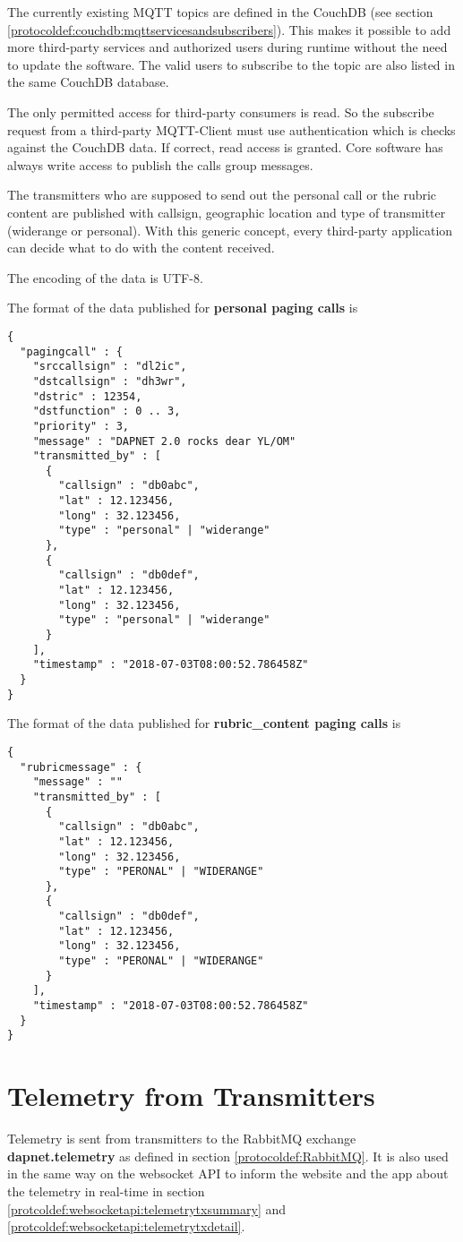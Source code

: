 The currently existing MQTT topics are defined in the CouchDB (see section \ref{protocoldef:couchdb:mqttservicesandsubscribers}). This makes it possible to add more third-party services and authorized users during runtime without the need to update the software.
The valid users to subscribe to the topic are also listed in the same CouchDB database.

The only permitted access for third-party consumers is read. So the subscribe request from a third-party MQTT-Client must use authentication which is checks against the CouchDB data. If correct, read access is granted. Core software has always write access to publish the calls group messages.

The transmitters who are supposed to send out the personal call or the rubric content are published with callsign, geographic location and type of transmitter (widerange or personal). With this generic concept, every third-party application can decide what to do with the content received.

The encoding of the data is UTF-8.

The format of the data published for \textbf{personal paging calls} is
\begin{lstlisting}
{
  "pagingcall" : {
    "srccallsign" : "dl2ic",
    "dstcallsign" : "dh3wr",
    "dstric" : 12354,
    "dstfunction" : 0 .. 3,
    "priority" : 3,
    "message" : "DAPNET 2.0 rocks dear YL/OM"
    "transmitted_by" : [
      {
        "callsign" : "db0abc",
        "lat" : 12.123456,
        "long" : 32.123456,
        "type" : "personal" | "widerange"
      },
      {
        "callsign" : "db0def",
        "lat" : 12.123456,
        "long" : 32.123456,
        "type" : "personal" | "widerange"
      }
    ],
    "timestamp" : "2018-07-03T08:00:52.786458Z"
  }
}
\end{lstlisting}

The format of the data published for \textbf{rubric\_content paging calls} is
\begin{lstlisting}
{
  "rubricmessage" : {
    "message" : ""
    "transmitted_by" : [
      {
        "callsign" : "db0abc",
        "lat" : 12.123456,
        "long" : 32.123456,
        "type" : "PERONAL" | "WIDERANGE"
      },
      {
        "callsign" : "db0def",
        "lat" : 12.123456,
        "long" : 32.123456,
        "type" : "PERONAL" | "WIDERANGE"
      }
    ],
    "timestamp" : "2018-07-03T08:00:52.786458Z"
  }
}
\end{lstlisting}

\section{Telemetry from Transmitters}
\label{protocoldef:telemetrytx}
Telemetry is sent from transmitters to the RabbitMQ exchange
\textbf{dapnet.telemetry} as defined in section \ref{protocoldef:RabbitMQ}. It
is also used in the same way on the websocket API to inform the website and the
app about the telemetry in real-time in section
\ref{protcoldef:websocketapi:telemetrytxsummary} and \ref{protcoldef:websocketapi:telemetrytxdetail}.

